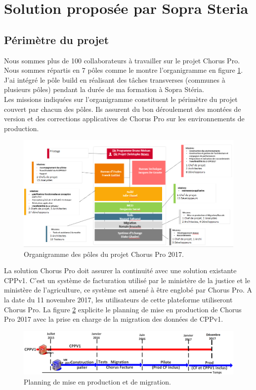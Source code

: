 \documentclass[12pt,a4paper]{article}
\begin{document}
\section{Solution proposée par Sopra Steria}
\subsection{Périmètre du projet}
Nous sommes plus de 100 collaborateurs à travailler sur le projet Chorus Pro. Nous sommes répartis en 7 pôles comme le montre l'organigramme en figure \ref{organigramme}. J'ai intégré le pôle build en réalisant des tâches transverses (communes à plusieurs pôles) pendant la durée de ma formation à Sopra Stéria.\\
Les missions indiquées sur l'organigramme constituent le périmètre du projet couvert par chacun des pôles. Ils assurent du bon déroulement des montées de version et des corrections applicatives de Chorus Pro sur les environnements de production.\\
\begin{figure}[!hp]
		\begin{center}
			\includegraphics[width=\textwidth,height=\textheight,keepaspectratio]{organigramme.png}
			\caption{Organigramme des pôles du projet Chorus Pro 2017.}
			\label{organigramme}
		\end{center}
\end{figure}
\clearpage
\newpage
La solution Chorus Pro doit assurer la continuité avec une solution existante CPPv1. C'est un système de facturation utilisé par le ministère de la justice et le ministère de l’agriculture, ce système est amené à être englobé par Chorus Pro. A la date du 11 novembre 2017, les utilisateurs de cette plateforme utiliseront Chorus Pro. La figure \ref{friseCpp} explicite le planning de mise en production de Chorus Pro 2017 avec la prise en charge de la migration des données de CPPv1.
\begin{figure}[!hp]
		\begin{center}
			\includegraphics[width=\textwidth,height=\textheight,keepaspectratio]{friseCpp.png}
			\caption{Planning de mise en production et de migration.}
			\label{friseCpp}
		\end{center}
\end{figure}
\end{document}
